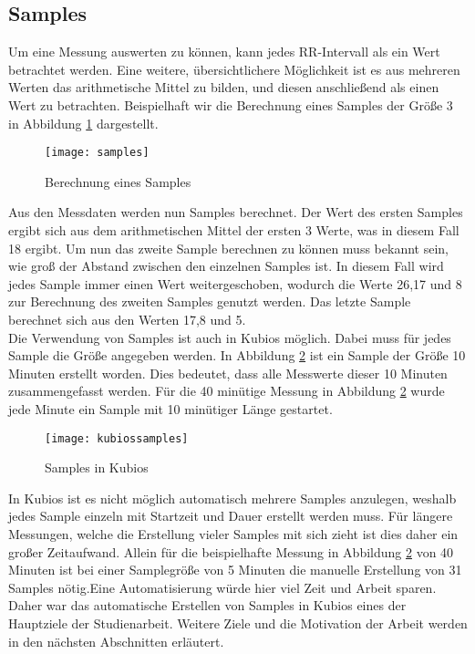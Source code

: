 \subsection{Samples}\label{subsec:textsamples}
Um eine Messung auswerten zu können, kann jedes RR-Intervall als ein Wert betrachtet werden. Eine weitere, übersichtlichere Möglichkeit ist es aus mehreren Werten das arithmetische Mittel zu bilden, und diesen anschließend als einen Wert zu betrachten. Beispielhaft wir die Berechnung eines Samples der Größe 3 in Abbildung \ref{fig:samples} dargestellt.
 \begin{figure}[H]
	\centering
	\texttt{[image: samples]}
	\caption{Berechnung eines Samples}
	\label{fig:samples}
\end{figure}
Aus den Messdaten werden nun Samples berechnet. Der Wert des ersten Samples ergibt sich aus dem arithmetischen Mittel der ersten 3 Werte, was in diesem Fall 18 ergibt. Um nun das zweite Sample berechnen zu können muss bekannt sein, wie groß der Abstand zwischen den einzelnen Samples ist. In diesem Fall wird jedes Sample immer einen Wert weitergeschoben, wodurch die Werte 26,17 und 8 zur Berechnung des zweiten Samples genutzt werden. Das letzte Sample berechnet sich aus den Werten 17,8 und 5.\\

Die Verwendung von Samples ist auch in Kubios möglich. Dabei muss für jedes Sample  die Größe angegeben werden. In Abbildung \ref{fig:kubiossamples} ist ein Sample der Größe 10 Minuten erstellt worden. Dies bedeutet, dass alle Messwerte dieser 10 Minuten zusammengefasst werden. Für die 40 minütige Messung in Abbildung \ref{fig:kubiossamples} wurde jede Minute ein Sample mit 10 minütiger Länge gestartet.\\

 \begin{figure}[H]
	\centering
	\texttt{[image: kubiossamples]}
	\caption{Samples in Kubios}
	\label{fig:kubiossamples}
\end{figure}

In Kubios ist es nicht möglich automatisch mehrere Samples anzulegen, weshalb jedes Sample einzeln mit Startzeit und Dauer erstellt werden muss. Für längere Messungen, welche die Erstellung vieler Samples mit sich zieht ist dies daher ein großer Zeitaufwand. Allein für die beispielhafte Messung in Abbildung \ref{fig:kubiossamples} von 40 Minuten ist bei einer Samplegröße von 5 Minuten die manuelle Erstellung von 31 Samples nötig.\color{red}Eine Automatisierung würde hier viel Zeit und Arbeit sparen. Daher war das automatische Erstellen von Samples in Kubios eines der Hauptziele der Studienarbeit. Weitere Ziele und die Motivation der Arbeit werden in den nächsten Abschnitten erläutert.\color{black} 